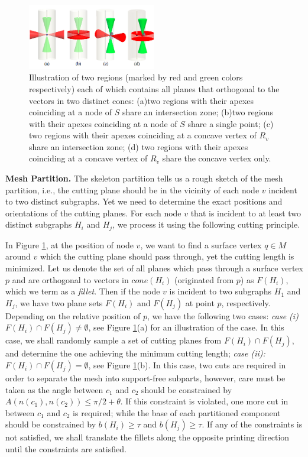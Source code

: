 \begin{figure}[t]
  \centering
  \mbox{} \hfill
  \includegraphics[width=0.5\textwidth]{figs/fillets.png}
  \caption{\label{fig:fillets}%
           Illustration of two regions (marked by red and green colors respectively) each of which contains all planes that orthogonal to the vectors in two distinct cones: (a)two regions with their apexes coinciding at a node of $S$ share an intersection zone; (b)two regions with their apexes coinciding at a node of $S$ share a single point; (c) two regions with their apexes coinciding at a concave vertex of $R_v$ share an intersection zone; (d) two regions with their apexes coinciding at a concave vertex of $R_v$ share the concave vertex only.}
\end{figure}


\textbf{Mesh Partition.} The skeleton partition tells us a rough sketch of the mesh partition, i.e., the cutting plane should be in the vicinity of each node $v$ incident to two distinct subgraphs. Yet we need to determine the exact positions and orientations of the cutting planes. For each node $v$ that is incident to at least two distinct subgraphs $H_i$ and $H_j$, we process it using the following cutting principle.


In Figure \ref{fig:fillets}, at the position of node $v$, we want to find a surface vertex $q \in M$ around $v$ which the cutting plane should pass through, yet the cutting length is minimized. Let us denote the set of all planes which pass through a surface vertex $p$ and are orthogonal to vectors in $cone(H_i)$ (originated from $p$)  as $F(H_i)$, which we term as a \emph{fillet}. Then if the node $v$ is incident to two subgraphs $H_1$ and $H_j$, we have two plane sets $F(H_i)$ and $F(H_j)$ at point $p$, respectively. Depending on the relative position of $p$, we have the following two cases: \emph{case (i)} $F(H_i) \cap F(H_j) \neq \emptyset$, see Figure \ref{fig:fillets}(a) for an illustration of the case. In this case, we shall randomly sample a set of cutting planes from $F(H_i) \cap F(H_j)$, and determine the one achieving the minimum cutting length; \emph{case (ii):} $F(H_i) \cap F(H_j) = \emptyset$, see Figure \ref{fig:fillets}(b). In this case, two cuts are required in order to separate the mesh into support-free subparts, however, care must be taken as the angle between $c_1$ and $c_2$ should be constrained by $A(n(c_1), n(c_2)) \leq \pi/2+ \theta$. If this constraint is violated, one more cut in between $c_1$ and $c_2$ is required; while the base of each partitioned component should be constrained by $b(H_i) \geq \tau$ and $b(H_j) \geq \tau$. If any of the constraints is not satisfied, we shall translate the fillets along the opposite printing direction until the constraints are satisfied.


